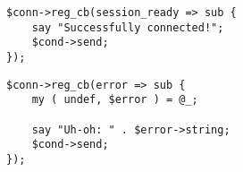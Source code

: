 \pause
\begin{shaded}
\begin{verbatim}
$conn->reg_cb(session_ready => sub {
    say "Successfully connected!";
    $cond->send;
});
\end{verbatim}
\end{shaded}

\begin{comment}
This example connects to the session\_ready signal, which is
fired when the connection is fully established.  \$cond->send is
the code we use to terminate the event loop.
\end{comment}

\pause
\begin{shaded}
\begin{verbatim}
$conn->reg_cb(error => sub {
    my ( undef, $error ) = @_;

    say "Uh-oh: " . $error->string;
    $cond->send;
});
\end{verbatim}
\end{shaded}

\begin{comment}
This chunk is similar to the previous, but we're connecting to the
error signal.  We ignore the first argument passed to the handler
(which is the connection object), and grab the error object to print
it out.
\end{comment}
